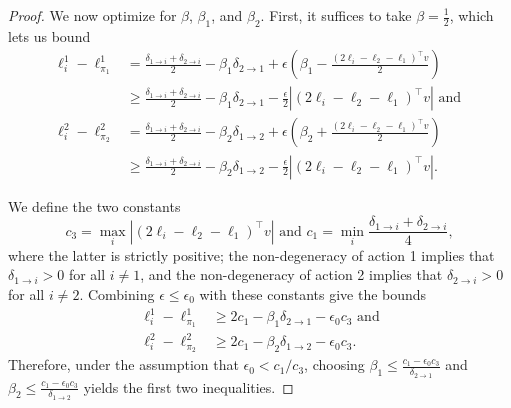 \documentclass{article}
\begin{document}
\begin{proof}

We now optimize for $\beta$, $\beta_1$, and $\beta_2$. First, it suffices to take $\beta = \frac12$, which lets us bound
\begin{align*}
    \ell_i^1 - \ell_{\pi_1}^1
  &=
    \frac{\delta_{1\rightarrow i}+\delta_{2 \rightarrow i}}{2} - \beta_1 \delta_{2\rightarrow 1}
    +\epsilon\left(\beta_1
    -\frac{\left(2\ell_i - \ell_2-\ell_1\right)^\top v}{2}\right) \\
&\geq
    \frac{\delta_{1\rightarrow i}+\delta_{2 \rightarrow i}}{2}
    -\beta_1\delta_{2\rightarrow 1}
    -\frac{\epsilon}{2}
    \left\vert \left(2\ell_i - \ell_2-\ell_1\right)^\top v\right\vert \text{ and }\\
  \ell_i^2 - \ell_{\pi_2}^2 
  &=
    \frac{\delta_{1\rightarrow i}+\delta_{2 \rightarrow i}}{2}
      - \beta_2 \delta_{1\rightarrow 2}
      +\epsilon\left( \beta_2 
    +\frac{\left(2\ell_i - \ell_2-\ell_1\right)^\top v}{2}
    \right)\\
          &\geq
          \frac{\delta_{1\rightarrow i}+\delta_{2 \rightarrow i}}{2}
      - \beta_2 \delta_{1\rightarrow 2}
      -\frac{\epsilon}{2}
        \left\vert \left(2\ell_i - \ell_2-\ell_1\right)^\top v\right\vert.
\end{align*}

We define the two constants 
\[
c_3 = \max_i \left\vert \left(2\ell_i - \ell_2-\ell_1\right)^\top v\right\vert \text{ and } c_1 = \min_i\frac{ \delta_{1\rightarrow i}+\delta_{2\rightarrow i}}{4},
\]
where the latter is strictly positive; the non-degeneracy of action 1 implies that  $\delta_{1\rightarrow i}>0$ for all $i\neq 1$, and the non-degeneracy of action 2 implies that $\delta_{2\rightarrow i}>0$ for all $i\neq 2$. Combining $\epsilon \leq \epsilon_0$ with these constants give the bounds
\begin{align*}
  \ell_i^1 - \ell_{\pi_1}^1
  &\geq
  2c_1  - \beta_1\delta_{2\rightarrow 1} - \epsilon_0 c_3
\text{ and}\\
  \ell_i^2 - \ell_{\pi_2}^2
  &\geq
  2c_1 - \beta_2\delta_{1\rightarrow 2} - \epsilon_0 c_3.
\end{align*}
Therefore, under the assumption that $\epsilon_0 < c_1/c_3$, choosing $\beta_1 \leq \frac{ c_1 - \epsilon_0 c_3}{\delta_{2\rightarrow 1}}$ and $\beta_2 \leq \frac{ c_1 - \epsilon_0 c_3}{\delta_{1\rightarrow 2}}$ yields the first two inequalities.


\end{proof}
\end{document}
